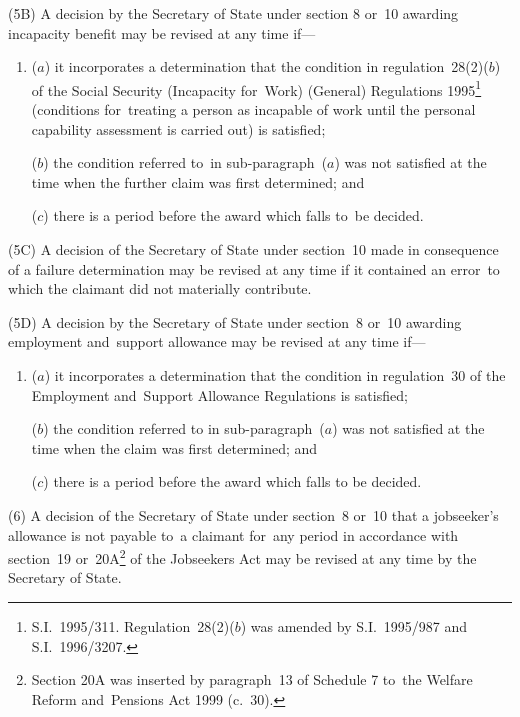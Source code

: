 \documentclass[12pt,a4paper]{article}
\begin{document}
(5B) A decision by the Secretary of State under section 8 or~10 awarding incapacity benefit may be revised at any time if—
\begin{enumerate}\item[]
\begin{sloppypar}
($a$) it incorporates a determination that the condition in regulation~28(2)($b$)  of the Social Security (Incapacity for~Work) (General) Regulations 1995\footnote{S.I.~1995/311. Regulation~28(2)($b$) was amended by S.I.~1995/987 and S.I.~1996/3207.} (conditions for~treating a person as incapable of work until the personal capability assessment is carried out) is satisfied;
\end{sloppypar}

($b$) the condition referred to~in sub-paragraph~($a$)  was not satisfied at the time when the further claim was first determined; and

($c$) there is a period before the award which falls to~be decided.
\end{enumerate}

(5C) A decision of the Secretary of State under section~10 made in consequence of a failure determination may be revised at any time if it contained an error~to which the claimant did not materially contribute.

(5D) A decision by the Secretary of State under section~8 or~10 awarding employment and~support allowance may be revised at any time if—
\begin{enumerate}\item[]
($a$) it incorporates a determination that the condition in regulation~30 of the Employment and~Support Allowance Regulations is satisfied;

($b$) the condition referred to in sub-paragraph~($a$)  was not satisfied at the time when the claim was first determined; and

($c$) there is a period before the award which falls to be decided.
\end{enumerate}

(6) A decision of the Secretary of State under section~8 or~10 that a jobseeker’s allowance is not payable to~a claimant for~any period in accordance with section~19 
or~20A\footnote{Section 20A was inserted by paragraph~13 of Schedule 7 to~the Welfare Reform and~Pensions Act 1999 (c.\ 30).}  %
of the Jobseekers Act may be revised at any time by the Secretary of State.
\end{document}

